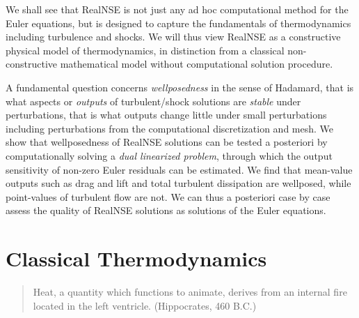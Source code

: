We shall see that RealNSE is not just any ad hoc computational method for the
Euler equations, but is designed to capture the fundamentals of thermodynamics
including turbulence and shocks.
We will thus view RealNSE as a constructive physical model of thermodynamics, in distinction
from a classical non-constructive mathematical model
without computational solution procedure.

A fundamental question concerns \emph{wellposedness} in the sense
of Hadamard, that is what aspects or \emph{outputs} of turbulent/shock 
solutions are \emph{stable} under perturbations, that is what outputs change
little under small perturbations including perturbations from the
computational discretization and mesh. 
We show that wellposedness of RealNSE solutions
can be tested a posteriori by computationally solving a \emph{dual linearized
problem}, through which the output sensitivity of non-zero Euler residuals
can be estimated. We find that mean-value outputs such as drag and lift 
and total turbulent dissipation are wellposed, while point-values
of turbulent flow are not. We can thus a posteriori case by case assess 
the quality of RealNSE solutions as solutions of the Euler equations. 










   
\fi  %

\chapter{Classical Thermodynamics}
\small
\begin{quote} Heat, a quantity which functions to animate, derives
from an internal fire located in the left ventricle. (Hippocrates, 460 B.C.)
\end{quote}
\normalsize 

